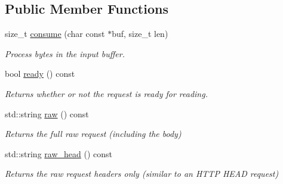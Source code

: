 \subsection*{Public Member Functions}
\begin{DoxyCompactItemize}
\item 
size\+\_\+t \mbox{\hyperlink{classwebsocketpp_1_1http_1_1parser_1_1request_abd9cae6f44634d62253d806d982ab1d6}{consume}} (char const $\ast$buf, size\+\_\+t len)
\begin{DoxyCompactList}\small\item\em Process bytes in the input buffer. \end{DoxyCompactList}\item 
\mbox{\label{classwebsocketpp_1_1http_1_1parser_1_1request_ac8c99fa6b7324d95b32edad8f9f584aa}} 
bool \mbox{\hyperlink{classwebsocketpp_1_1http_1_1parser_1_1request_ac8c99fa6b7324d95b32edad8f9f584aa}{ready}} () const
\begin{DoxyCompactList}\small\item\em Returns whether or not the request is ready for reading. \end{DoxyCompactList}\item 
\mbox{\label{classwebsocketpp_1_1http_1_1parser_1_1request_a27fbcad6aae2a98c9cc0efc4fdd7da8c}} 
std\+::string \mbox{\hyperlink{classwebsocketpp_1_1http_1_1parser_1_1request_a27fbcad6aae2a98c9cc0efc4fdd7da8c}{raw}} () const
\begin{DoxyCompactList}\small\item\em Returns the full raw request (including the body) \end{DoxyCompactList}\item 
\mbox{\label{classwebsocketpp_1_1http_1_1parser_1_1request_afb77b09be8112bb60dd80cf21d032eff}} 
std\+::string \mbox{\hyperlink{classwebsocketpp_1_1http_1_1parser_1_1request_afb77b09be8112bb60dd80cf21d032eff}{raw\+\_\+head}} () const
\begin{DoxyCompactList}\small\item\em Returns the raw request headers only (similar to an H\+T\+TP H\+E\+AD request) \end{DoxyCompactList}\item 
\mbox{\label{classwebsocketpp_1_1http_1_1parser_1_1request_af1f0c6944c6cbbaf6db20e5830333eaf}} 

\end{DoxyCompactItemize}
